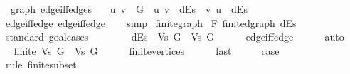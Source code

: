 \begin{isabellebody}
%
\isadeliminvisible
\isanewline
%
\endisadeliminvisible
%
\isataginvisible
{}\isamarkupfalse%
\ {\isacharparenleft}{\kern0pt}\ graph{\isacharparenright}{\kern0pt}\ edge{\isacharunderscore}{\kern0pt}iff{\isacharunderscore}{\kern0pt}edges{\isacharcolon}{\kern0pt}\isanewline
\ \ \ {\isachardoublequoteopen}{\isacharbraceleft}{\kern0pt}u{\isacharcomma}{\kern0pt}\ v{\isacharbraceright}{\kern0pt}\ {\isasymin}\ G\ {\isasymlongleftrightarrow}\ {\isacharparenleft}{\kern0pt}u{\isacharcomma}{\kern0pt}\ v{\isacharparenright}{\kern0pt}\ {\isasymin}\ dEs\ {\isasymand}\ {\isacharparenleft}{\kern0pt}v{\isacharcomma}{\kern0pt}\ u{\isacharparenright}{\kern0pt}\ {\isasymin}\ dEs{\isachardoublequoteclose}%
\endisataginvisible
{\isafoldinvisible}%
%
\isadeliminvisible
\isanewline
%
\endisadeliminvisible
%
\isadelimproof
\ \ %
\endisadelimproof
%
\isatagproof
{}\isamarkupfalse%
\ edge{\isacharunderscore}{\kern0pt}iff{\isacharunderscore}{\kern0pt}edge{\isacharunderscore}{\kern0pt}{}\ edge{\isacharunderscore}{\kern0pt}iff{\isacharunderscore}{\kern0pt}edge{\isacharunderscore}{\kern0pt}{}\isanewline
\ \ \isamarkupfalse%
\ simp%
\endisatagproof
{\isafoldproof}%
%
\isadelimproof
\isanewline
%
\endisadelimproof
\isanewline
{}\isamarkupfalse%
\ finite{\isacharunderscore}{\kern0pt}graph\isanewline
{}\isanewline
{}\isamarkupfalse%
\ F{\isacharcolon}{\kern0pt}\ finite{\isacharunderscore}{\kern0pt}dgraph\ dEs\isanewline
%
\isadelimproof
%
\endisadelimproof
%
\isatagproof
{}\isamarkupfalse%
\ {\isacharparenleft}{\kern0pt}standard{\isacharcomma}{\kern0pt}\ goal{\isacharunderscore}{\kern0pt}cases{\isacharparenright}{\kern0pt}\isanewline
\ \ \isamarkupfalse%
\ {}\isanewline
\ \ \isamarkupfalse%
\ {\isachardoublequoteopen}dEs\ {\isasymsubseteq}\ Vs\ G\ {\isasymtimes}\ Vs\ G{\isachardoublequoteclose}\isanewline
\ \ \ \ \isamarkupfalse%
\ edge{\isacharunderscore}{\kern0pt}iff{\isacharunderscore}{\kern0pt}edge{\isacharunderscore}{\kern0pt}{}\isanewline
\ \ \ \ \isamarkupfalse%
\ auto\isanewline
\ \ \isamarkupfalse%
\ \isamarkupfalse%
\ {\isachardoublequoteopen}finite\ {\isacharparenleft}{\kern0pt}Vs\ G\ {\isasymtimes}\ Vs\ G{\isacharparenright}{\kern0pt}{\isachardoublequoteclose}\isanewline
\ \ \ \ \isamarkupfalse%
\ finite{\isacharunderscore}{\kern0pt}vertices\isanewline
\ \ \ \ \isamarkupfalse%
\ fast\isanewline
\ \ \isamarkupfalse%
\ \isamarkupfalse%
\ {\isacharquery}{\kern0pt}case\isanewline
\ \ \ \ \isamarkupfalse%
\ {\isacharparenleft}{\kern0pt}rule\ finite{\isacharunderscore}{\kern0pt}subset{\isacharparenright}{\kern0pt}\isanewline
{}\isamarkupfalse%
%
\endisatagproof
{\isafoldproof}%
%
\isadelimproof
\isanewline
%
\endisadelimproof
{}\isamarkupfalse%
\isanewline
%
\isadelimtheory
\isanewline
%
\endisadelimtheory
%
\isatagtheory
{}\isamarkupfalse%
%
\endisatagtheory
{\isafoldtheory}%
%
\isadelimtheory
%
\endisadelimtheory
%
\end{isabellebody}%
